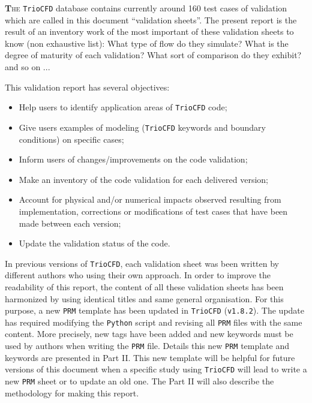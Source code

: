 \lettrine[lines=2,slope=0pt,nindent=4pt]{\textbf{T}}{he} \texttt{TrioCFD}
database contains currently around 160 test cases of validation which
are called in this document ``validation sheets''. The present
report is the result of an inventory work of the most important of these validation
sheets to know (non exhaustive list): What type of flow do they simulate?
What is the degree of maturity of each validation? What sort of
comparison do they exhibit? and so on ... \smallskip\newline

This validation report has several objectives:
\begin{itemize}
\item Help users to identify application areas of \texttt{TrioCFD} code;
\item Give users examples of modeling (\texttt{TrioCFD} keywords and boundary
conditions) on specific cases;
\item Inform users of changes/improvements on the code validation;
\item Make an inventory of the code validation for each delivered version;
\item Account for physical and/or numerical impacts observed resulting from
implementation, corrections or modifications of test cases that have
been made between each version;
\item Update the validation status of the code.
\end{itemize}

In previous versions of \texttt{TrioCFD}, each validation sheet was
been written by different authors who using their own approach. In order
to improve the readability of this report, the content of all these validation
sheets has been harmonized by using identical titles and same general
organisation. For this purpose, a new \texttt{PRM} template has been
updated in \texttt{TrioCFD} (\texttt{v1.8.2}). The update has required
modifying the \texttt{Python} script and revising all \texttt{PRM}
files with the same content. More precisely, new tags have been added
and new keywords must be used by authors when writing the \texttt{PRM}
file. Details this new \texttt{PRM} template and keywords are presented
in Part II. This new template will be helpful for future versions
of this document when a specific study using \texttt{TrioCFD} will
lead to write a new \texttt{PRM} sheet or to update an old one. The Part II
will also describe the methodology for making this report.\smallskip\newline

